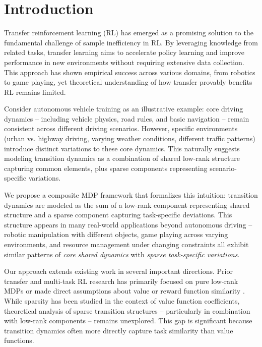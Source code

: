 


\section{Introduction}

Transfer reinforcement learning (RL) has emerged as a promising solution to the fundamental challenge of sample inefficiency in RL. By leveraging knowledge from related tasks, transfer learning aims to accelerate policy learning and improve performance in new environments without requiring extensive data collection. This approach has shown empirical success across various domains, from robotics to game playing, yet theoretical understanding of how transfer provably benefits RL remains limited.

Consider autonomous vehicle training as an illustrative example: core driving dynamics -- including vehicle physics, road rules, and basic navigation -- remain consistent across different driving scenarios. However, specific environments (urban vs. highway driving, varying weather conditions, different traffic patterns) introduce distinct variations to these core dynamics. This naturally suggests modeling transition dynamics as a combination of shared low-rank structure capturing common elements, plus sparse components representing scenario-specific variations.

We propose a composite MDP framework that formalizes this intuition: transition dynamics are modeled as the sum of a low-rank component representing shared structure and a sparse component capturing task-specific deviations. This structure appears in many real-world applications beyond autonomous driving -- robotic manipulation with different objects, game playing across varying environments, and resource management under changing constraints all exhibit similar patterns of {\em core shared dynamics} with {\em sparse task-specific variations}.

Our approach extends existing work in several important directions. Prior transfer and multi-task RL research has primarily focused on pure low-rank MDPs \citep{agarwal2023provable,lu2021power,cheng2022provable} or made direct assumptions about value or reward function similarity \citep{calandriello2014sparse,du2024misspecified,chen2024data,chai2025deep}. While sparsity has been studied in the context of value function coefficients, theoretical analysis of sparse transition structures -- particularly in combination with low-rank components -- remains unexplored. This gap is significant because transition dynamics often more directly capture task similarity than value functions.

